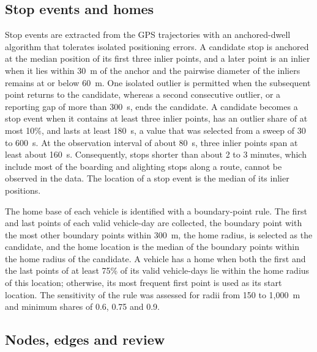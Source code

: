 \subsection{Stop events and homes}

Stop events are extracted from the GPS trajectories with an anchored-dwell algorithm that tolerates isolated positioning errors. A candidate stop is anchored at the median position of its first three inlier points, and a later point is an inlier when it lies within 30~m of the anchor and the pairwise diameter of the inliers remains at or below 60~m. One isolated outlier is permitted when the subsequent point returns to the candidate, whereas a second consecutive outlier, or a reporting gap of more than 300~s, ends the candidate. A candidate becomes a stop event when it contains at least three inlier points, has an outlier share of at most 10\%, and lasts at least 180~s, a value that was selected from a sweep of 30 to 600~s. At the observation interval of about 80~s, three inlier points span at least about 160~s. Consequently, stops shorter than about 2 to 3 minutes, which include most of the boarding and alighting stops along a route, cannot be observed in the data. The location of a stop event is the median of its inlier positions.

The home base of each vehicle is identified with a boundary-point rule. The first and last points of each valid vehicle-day are collected, the boundary point with the most other boundary points within 300~m, the home radius, is selected as the candidate, and the home location is the median of the boundary points within the home radius of the candidate. A vehicle has a home when both the first and the last points of at least 75\% of its valid vehicle-days lie within the home radius of this location; otherwise, its most frequent first point is used as its start location. The sensitivity of the rule was assessed for radii from 150 to 1{,}000~m and minimum shares of 0.6, 0.75 and 0.9.

\subsection{Nodes, edges and review}

